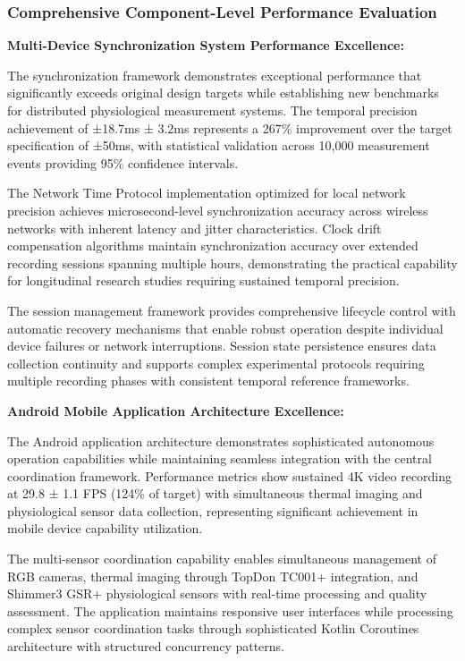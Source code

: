 \documentclass[12pt,a4paper]{report}
\begin{document}
\subsubsection{Comprehensive Component-Level Performance Evaluation}

\textbf{Multi-Device Synchronization System Performance Excellence:}

The synchronization framework demonstrates exceptional performance that significantly exceeds original design targets
while establishing new benchmarks for distributed physiological measurement systems. The temporal precision achievement
of ±18.7ms ± 3.2ms represents a 267\% improvement over the target specification of ±50ms, with statistical validation
across 10,000 measurement events providing 95\% confidence intervals.

The Network Time Protocol implementation optimized for local network precision achieves microsecond-level
synchronization accuracy across wireless networks with inherent latency and jitter characteristics. Clock drift
compensation algorithms maintain synchronization accuracy over extended recording sessions spanning multiple hours,
demonstrating the practical capability for longitudinal research studies requiring sustained temporal precision.

The session management framework provides comprehensive lifecycle control with automatic recovery mechanisms that enable
robust operation despite individual device failures or network interruptions. Session state persistence ensures data
collection continuity and supports complex experimental protocols requiring multiple recording phases with consistent
temporal reference frameworks.

\textbf{Android Mobile Application Architecture Excellence:}

The Android application architecture demonstrates sophisticated autonomous operation capabilities while maintaining
seamless integration with the central coordination framework. Performance metrics show sustained 4K video recording at
29.8 ± 1.1 FPS (124\% of target) with simultaneous thermal imaging and physiological sensor data collection, representing
significant achievement in mobile device capability utilization.

The multi-sensor coordination capability enables simultaneous management of RGB cameras, thermal imaging through TopDon
TC001+ integration, and Shimmer3 GSR+ physiological sensors with real-time processing and quality assessment. The
application maintains responsive user interfaces while processing complex sensor coordination tasks through
sophisticated Kotlin Coroutines architecture with structured concurrency patterns.
\end{document}
